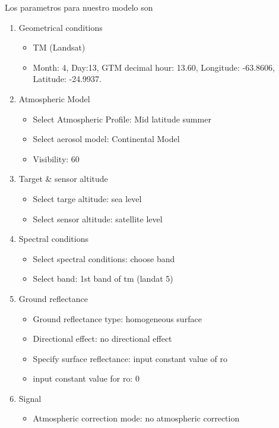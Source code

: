 Los parametros para nuestro modelo son

\begin{enumerate}
    \item Geometrical conditions
        \begin{itemize}
            \item TM (Landsat)
            \item Month: 4, Day:13, GTM decimal hour: 13.60, Longitude:
                -63.8606, Latitude: -24.9937.
        \end{itemize}
    \item Atmospheric Model
        \begin{itemize}
            \item Select Atmospheric Profile: Mid latitude summer
            \item Select aerosol model: Continental Model
            \item Visibility: 60
        \end{itemize}
    \item Target \& sensor altitude
        \begin{itemize}
            \item Select targe altitude: sea level
            \item Select sensor altitude: satellite level
        \end{itemize}
    \item Spectral conditions
        \begin{itemize}
            \item Select spectral conditions: choose band
            \item Select band: 1st band of tm (landat 5)
        \end{itemize}
    \item Ground reflectance
        \begin{itemize}
            \item Ground reflectance type: homogeneous surface
            \item Directional effect: no directional effect
            \item Specify surface reflectance: input constant value of ro
            \item input constant value for ro: 0
        \end{itemize}
    \item Signal
        \begin{itemize}
            \item Atmospheric correction mode: no atmospheric correction
        \end{itemize}
\end{enumerate}

